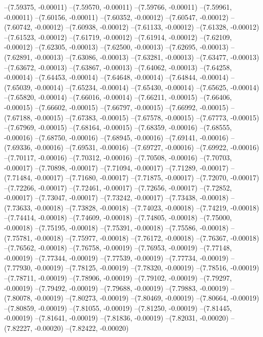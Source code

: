--(7.59375, -0.00011)
--(7.59570, -0.00011)
--(7.59766, -0.00011)
--(7.59961, -0.00011)
--(7.60156, -0.00011)
--(7.60352, -0.00012)
--(7.60547, -0.00012)
--(7.60742, -0.00012)
--(7.60938, -0.00012)
--(7.61133, -0.00012)
--(7.61328, -0.00012)
--(7.61523, -0.00012)
--(7.61719, -0.00012)
--(7.61914, -0.00012)
--(7.62109, -0.00012)
--(7.62305, -0.00013)
--(7.62500, -0.00013)
--(7.62695, -0.00013)
--(7.62891, -0.00013)
--(7.63086, -0.00013)
--(7.63281, -0.00013)
--(7.63477, -0.00013)
--(7.63672, -0.00013)
--(7.63867, -0.00013)
--(7.64062, -0.00013)
--(7.64258, -0.00014)
--(7.64453, -0.00014)
--(7.64648, -0.00014)
--(7.64844, -0.00014)
--(7.65039, -0.00014)
--(7.65234, -0.00014)
--(7.65430, -0.00014)
--(7.65625, -0.00014)
--(7.65820, -0.00014)
--(7.66016, -0.00014)
--(7.66211, -0.00015)
--(7.66406, -0.00015)
--(7.66602, -0.00015)
--(7.66797, -0.00015)
--(7.66992, -0.00015)
--(7.67188, -0.00015)
--(7.67383, -0.00015)
--(7.67578, -0.00015)
--(7.67773, -0.00015)
--(7.67969, -0.00015)
--(7.68164, -0.00015)
--(7.68359, -0.00016)
--(7.68555, -0.00016)
--(7.68750, -0.00016)
--(7.68945, -0.00016)
--(7.69141, -0.00016)
--(7.69336, -0.00016)
--(7.69531, -0.00016)
--(7.69727, -0.00016)
--(7.69922, -0.00016)
--(7.70117, -0.00016)
--(7.70312, -0.00016)
--(7.70508, -0.00016)
--(7.70703, -0.00017)
--(7.70898, -0.00017)
--(7.71094, -0.00017)
--(7.71289, -0.00017)
--(7.71484, -0.00017)
--(7.71680, -0.00017)
--(7.71875, -0.00017)
--(7.72070, -0.00017)
--(7.72266, -0.00017)
--(7.72461, -0.00017)
--(7.72656, -0.00017)
--(7.72852, -0.00017)
--(7.73047, -0.00017)
--(7.73242, -0.00017)
--(7.73438, -0.00018)
--(7.73633, -0.00018)
--(7.73828, -0.00018)
--(7.74023, -0.00018)
--(7.74219, -0.00018)
--(7.74414, -0.00018)
--(7.74609, -0.00018)
--(7.74805, -0.00018)
--(7.75000, -0.00018)
--(7.75195, -0.00018)
--(7.75391, -0.00018)
--(7.75586, -0.00018)
--(7.75781, -0.00018)
--(7.75977, -0.00018)
--(7.76172, -0.00018)
--(7.76367, -0.00018)
--(7.76562, -0.00018)
--(7.76758, -0.00019)
--(7.76953, -0.00019)
--(7.77148, -0.00019)
--(7.77344, -0.00019)
--(7.77539, -0.00019)
--(7.77734, -0.00019)
--(7.77930, -0.00019)
--(7.78125, -0.00019)
--(7.78320, -0.00019)
--(7.78516, -0.00019)
--(7.78711, -0.00019)
--(7.78906, -0.00019)
--(7.79102, -0.00019)
--(7.79297, -0.00019)
--(7.79492, -0.00019)
--(7.79688, -0.00019)
--(7.79883, -0.00019)
--(7.80078, -0.00019)
--(7.80273, -0.00019)
--(7.80469, -0.00019)
--(7.80664, -0.00019)
--(7.80859, -0.00019)
--(7.81055, -0.00019)
--(7.81250, -0.00019)
--(7.81445, -0.00019)
--(7.81641, -0.00019)
--(7.81836, -0.00019)
--(7.82031, -0.00020)
--(7.82227, -0.00020)
--(7.82422, -0.00020)
